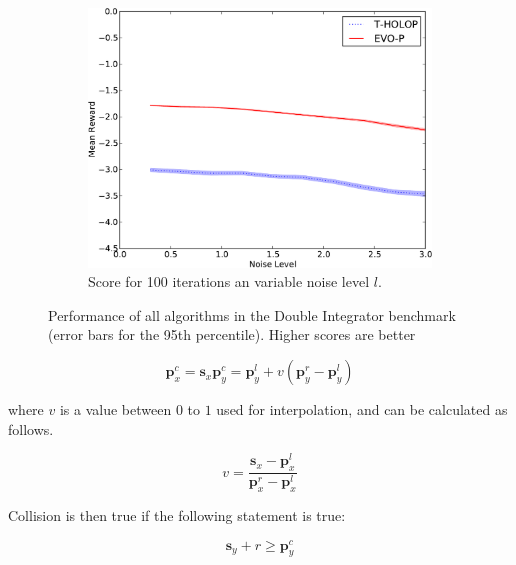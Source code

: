 \documentclass[conference]{IEEEtran}
\begin{document}
\begin{figure}[ht]
\begin{subfigure}[b]{0.32\textwidth}
                \label{fig:DI-N-50}
        \end{subfigure}   \begin{subfigure}[b]{0.32\textwidth}
                \centering
                \includegraphics[width=1.0\textwidth]{graphics/online-noise-DI_100-crop.pdf}
                \caption{Score for 100 iterations an variable noise level $l$.}
                \label{fig:DI-N-100}
        \end{subfigure}

  \label{fig:DI-all}

       \caption{Performance of all algorithms in the Double Integrator benchmark (error bars for the 95th percentile). Higher scores are better}


\end{figure}

\begin{equation}
\bm {p}_{x}^{c} = \bm {s}_{x}
\bm {p}_{y}^{c} = \bm {p}_{y}^{l} + v(\bm {p}_{y}^{r} - \bm {p}_{y}^{l})
\end{equation}

where $v$ is a value between $0$ to $1$ used for interpolation, and can be calculated as follows.

\begin{equation}
v = \frac{ {\bm {s}_{x} - \bm {p}_{x}^{l}}}{ {\bm {p}_{x}^{r} - \bm {p}_{x}^{l}} }
\end{equation}

Collision is then true if the following statement is true:

\begin{equation}
\bm {s}_{y} + r \geq \bm {p}^{c}_{y}
\end{equation}
\end{document}
